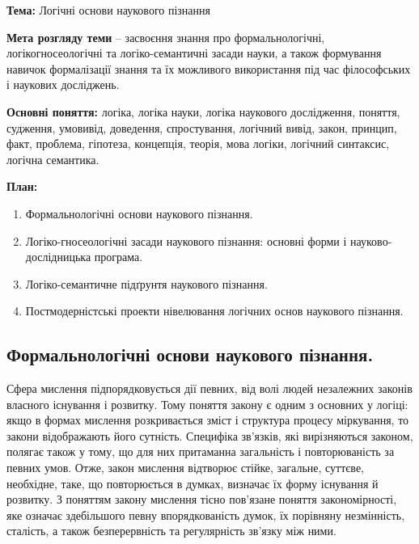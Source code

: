 \textbf{Тема:} Логічні основи наукового пізнання

\textbf{Мета розгляду теми} – засвоєння знання про формальнологічні, логікогносеологічні та логіко-семантичні засади науки, а також формування навичок
формалізації знання та їх можливого використання під час філософських і
наукових досліджень.

\textbf{Основні поняття:} логіка, логіка науки, логіка наукового дослідження,
поняття, судження, умовивід, доведення, спростування, логічний вивід, закон,
принцип, факт, проблема, гіпотеза, концепція, теорія, мова логіки, логічний
синтаксис, логічна семантика.

\textbf{План:}
\begin{enumerate}
	\item Формальнологічні основи наукового пізнання.
	
	\item Логіко-гносеологічні засади наукового пізнання: основні форми і
	науково-дослід\-ницька програма.
	
	\item Логіко-семантичне підґрунтя наукового пізнання.
	
	\item Постмодерністські проекти нівелювання логічних основ наукового
	пізнання.
\end{enumerate}

\subsection{Формальнологічні основи наукового пізнання.} Сфера мислення
підпорядковується дії певних, від волі людей незалежних законів власного
існування і розвитку. Тому поняття закону є одним з основних у логіці: якщо в
формах мислення розкривається зміст і структура процесу міркування, то
закони відображають його сутність. Специфіка зв’язків, які вирізняються
законом, полягає також у тому, що для них притаманна загальність і
повторюваність за певних умов. Отже, закон мислення відтворює стійке,
загальне, суттєве, необхідне, таке, що повторюється в думках, визначає їх 
форму існування й розвитку. З поняттям закону мислення тісно пов’язане
поняття закономірності, яке означає здебільшого певну впорядкованість думок,
їх порівняну незмінність, сталість, а також безперервність та регулярність
зв’язку між ними.

